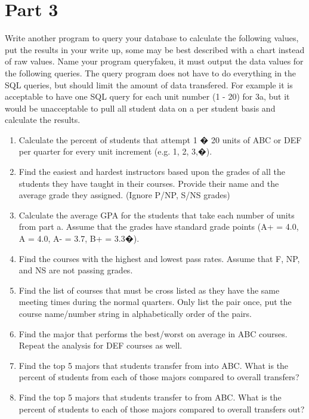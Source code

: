 \documentclass{article}
\begin{document}
\section*{Part 3}
Write another program to query your database to calculate the following values, put the results in your write up, some may be best described with a chart instead of raw values. 
Name your program queryfakeu, it must output the data values for the following queries. 
The query program does not have to do everything in the SQL queries, but should limit the amount of data transfered. 
For example it is acceptable to have one SQL query for each unit number (1 - 20) for 3a, but it would be unacceptable to pull all student data on a per student basis and calculate the results. 
\begin{enumerate}[label=\alph*.]
\item Calculate the percent of students that attempt 1 � 20 units of ABC or DEF per quarter for every unit increment (e.g. 1, 2, 3,�). \\
 \clearpage
\item Find the easiest and hardest instructors based upon the grades of all the students they have taught in their courses. Provide their name and the average grade they assigned. (Ignore P/NP, S/NS grades) \\
 \clearpage
\item Calculate the average GPA for the students that take each number of units from part a. Assume that the grades have standard grade points (A+ = 4.0, A = 4.0, A- = 3.7, B+ = 3.3�). \\
 \clearpage
\item Find the courses with the highest and lowest pass rates. Assume that F, NP, and NS are not passing grades. \\
 \clearpage
\item Find the list of courses that must be cross listed as they have the same meeting times during the normal quarters. Only list the pair once, put the course name/number string in alphabetically order of the pairs. \\
 \clearpage
\item Find the major that performs the best/worst on average in ABC courses. Repeat the analysis for DEF courses as well. \\
 \clearpage
\item Find the top 5 majors that students transfer from into ABC. What is the percent of students from each of those majors compared to overall transfers? \\
 \clearpage
\item Find the top 5 majors that students transfer to from ABC. What is the percent of students to each of those majors compared to overall transfers out? \\
 \clearpage
\end{enumerate}
\end{document}
